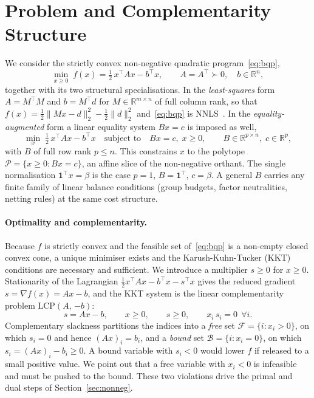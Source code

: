\section{Problem and Complementarity Structure}\label{sec:problem}

We consider the strictly convex non-negative quadratic program~\eqref{eq:bqp},
\[
  \min_{x \geq 0}\; f(x) = \tfrac{1}{2}\,x^\top A x - b^\top x,
  \qquad A = A^\top \succ 0,\quad b \in \mathbb{R}^n,
\]
together with its two structural specialisations. In the \emph{least-squares} form
$A = M^\top M$ and $b = M^\top d$ for $M \in \mathbb{R}^{m\times n}$ of full column rank, so
that $f(x) = \tfrac{1}{2}\|Mx - d\|_2^2 - \tfrac{1}{2}\|d\|_2^2$ and~\eqref{eq:bqp} is
NNLS~\cite{lawson1974}. In the \emph{equality-augmented} form a linear equality
system $Bx = c$ is imposed as well,
\begin{equation}\label{eq:eqp}
  \min_{x}\; \tfrac{1}{2}\,x^\top A x - b^\top x
  \quad\text{subject to}\quad Bx = c,\; x \geq 0,
  \qquad B \in \mathbb{R}^{p\times n},\; c \in \mathbb{R}^p,
\end{equation}
with $B$ of full row rank $p \leq n$. This constrains $x$ to the polytope
$\mathcal{P} = \{x \geq 0 : Bx = c\}$, an affine slice of the non-negative
orthant. The single normalisation $\mathbf{1}^\top x = \beta$ is the case $p=1$,
$B = \mathbf{1}^\top$, $c = \beta$. A general $B$ carries any finite family of
linear balance conditions (group budgets, factor neutralities, netting rules)
at the same cost structure.

\paragraph{Optimality and complementarity.}
Because $f$ is strictly convex and the feasible set of~\eqref{eq:bqp} is a non-empty closed
convex cone, a unique minimiser exists and the Karush-Kuhn-Tucker (KKT) conditions are
necessary and sufficient. We introduce a multiplier $s \geq 0$ for $x \geq 0$. Stationarity of
the Lagrangian $\tfrac{1}{2}x^\top A x - b^\top x - s^\top x$ gives the reduced gradient
$s = \nabla f(x) = A x - b$, and the KKT system is the linear complementarity problem
$\mathrm{LCP}(A,\,{-b})$:
\begin{equation}\label{eq:lcp}
  s = A x - b, \qquad x \geq 0, \qquad s \geq 0, \qquad x_i\,s_i = 0 \ \ \forall i.
\end{equation}
Complementary slackness partitions the indices into a \emph{free} set
$\mathcal{F} = \{i : x_i > 0\}$, on which $s_i = 0$ and hence $(Ax)_i = b_i$, and a
\emph{bound} set $\mathcal{B} = \{i : x_i = 0\}$, on which $s_i = (Ax)_i - b_i \geq 0$. A
bound variable with $s_i < 0$ would lower $f$ if released to a small positive value. We point out that a free
variable with $x_i < 0$ is infeasible and must be pushed to the bound. These two violations
drive the primal and dual steps of Section~\ref{sec:nonneg}.

